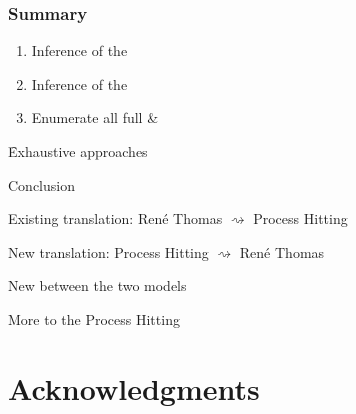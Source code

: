 \begin{frame}[c]
  \frametitle{Summary}

\begin{enumerate}[1.]
  \item Inference of the 
  \item Inference of the 
  \item Enumerate all full \& 
\end{enumerate}
\quad\quad\f Exhaustive approaches

\pause
\bigskip
\begin{flushright}
\Large
\textcolor{couleurtheme}{Conclusion}\hspace*{2.7em}
\end{flushright}

\medskip
Existing translation: René Thomas $\rightsquigarrow$ Process Hitting

\smallskip
New translation: Process Hitting $\rightsquigarrow$ René Thomas

\smallskip
\begin{fleches}
  \item New  between the two models
  \item More  to the Process Hitting
\end{fleches}
\end{frame}



\section[x]{Acknowledgments}


